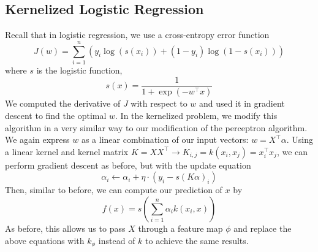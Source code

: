 \subsection{Kernelized Logistic Regression}
Recall that in logistic regression, we use a cross-entropy error function
$$ J(w) = \sum_{i = 1}^n (y_i \log(s(x_i)) + (1 - y_i) \log(1 - s(x_i))) $$
where $ s $ is the logistic function,
$$ s(x) = \frac{1}{1 + \exp(- w^\intercal x)} $$
We computed the derivative of $ J $ with respect to $ w $ and used it in gradient descent to find the optimal $ w $. In the kernelized problem, we modify this algorithm in a very similar way to our modification of the perceptron algorithm. We again express $ w $ as a linear combination of our input vectors: $ w = X^\intercal \alpha $. Using a linear kernel and kernel matrix $ K = X X^\intercal \rightarrow K_{i, j} = k(x_i, x_j) = x_i^\intercal x_j $, we can perform gradient descent as before, but with the update equation
$$ \alpha_i \gets \alpha_i + \eta \cdot (y_i - s(K \alpha)_i) $$
Then, similar to before, we can compute our prediction of $ x $ by
$$ f(x) = s \left( \sum_{i = 1}^n \alpha_i k(x_i, x) \right) $$
As before, this allows us to pass $ X $ through a feature map $ \phi $ and replace the above equations with $ k_\phi $ instead of $ k $ to achieve the same results.
